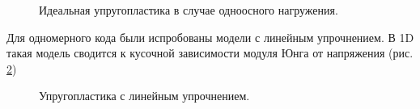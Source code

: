\begin{figure}
\caption{Идеальная упругопластика в случае одноосного нагружения.}
\label{pic:ideal_plastic}
\end{figure}

Для одномерного кода были испробованы модели с линейным упрочнением. В 1D такая модель сводится к кусочной зависимости модуля Юнга от напряжения (рис. \ref{pic:uprochnenie})

\begin{figure}
\caption{Упругопластика с линейным упрочнением.}
\label{pic:uprochnenie}
\end{figure}


